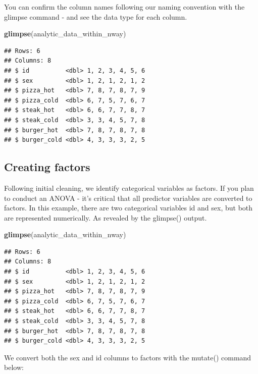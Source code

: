 \documentclass[
]{krantz}
\makeatletter
\newenvironment{Shaded}{\begin{snugshade}}{\end{snugshade}}
\newcommand{\KeywordTok}[1]{\textcolor[rgb]{0.27,0.27,0.27}{\textbf{#1}}}
\newcommand{\NormalTok}[1]{#1}
\newenvironment{kframe}{%
\medskip{}
\setlength{\fboxsep}{.8em}
 \def\at@end@of@kframe{}%
 \ifinner\ifhmode%
  \def\at@end@of@kframe{\end{minipage}}%
  \begin{minipage}{\columnwidth}%
 \fi\fi%
 \def\FrameCommand##1{\hskip\@totalleftmargin \hskip-\fboxsep
 \colorbox{shadecolor}{##1}\hskip-\fboxsep
     \hskip-\linewidth \hskip-\@totalleftmargin \hskip\columnwidth}%
 \MakeFramed {\advance\hsize-\width
   \@totalleftmargin\z@ \linewidth\hsize
   \@setminipage}}%
 {\par\unskip\endMakeFramed%
 \at@end@of@kframe}
\renewenvironment{Shaded}{\begin{kframe}}{\end{kframe}}
\makeatother
\begin{document}
You can confirm the column names following our naming convention with the glimpse command - and see the data type for each column.

\begin{Shaded}
\begin{Highlighting}[]
\KeywordTok{glimpse}\NormalTok{(analytic_data_within_nway)}
\end{Highlighting}
\end{Shaded}

\begin{verbatim}
## Rows: 6
## Columns: 8
## $ id          <dbl> 1, 2, 3, 4, 5, 6
## $ sex         <dbl> 1, 2, 1, 2, 1, 2
## $ pizza_hot   <dbl> 7, 8, 7, 8, 7, 9
## $ pizza_cold  <dbl> 6, 7, 5, 7, 6, 7
## $ steak_hot   <dbl> 6, 6, 7, 7, 8, 7
## $ steak_cold  <dbl> 3, 3, 4, 5, 7, 8
## $ burger_hot  <dbl> 7, 8, 7, 8, 7, 8
## $ burger_cold <dbl> 4, 3, 3, 3, 2, 5
\end{verbatim}

\hypertarget{creating-factors-2}{%
\subsection{Creating factors}\label{creating-factors-2}}

Following initial cleaning, we identify categorical variables as factors. If you plan to conduct an ANOVA - it's critical that all predictor variables are converted to factors. In this example, there are two categorical variables id and sex, but both are represented numerically. As revealed by the glimpse() output.

\begin{Shaded}
\begin{Highlighting}[]
\KeywordTok{glimpse}\NormalTok{(analytic_data_within_nway)}
\end{Highlighting}
\end{Shaded}

\begin{verbatim}
## Rows: 6
## Columns: 8
## $ id          <dbl> 1, 2, 3, 4, 5, 6
## $ sex         <dbl> 1, 2, 1, 2, 1, 2
## $ pizza_hot   <dbl> 7, 8, 7, 8, 7, 9
## $ pizza_cold  <dbl> 6, 7, 5, 7, 6, 7
## $ steak_hot   <dbl> 6, 6, 7, 7, 8, 7
## $ steak_cold  <dbl> 3, 3, 4, 5, 7, 8
## $ burger_hot  <dbl> 7, 8, 7, 8, 7, 8
## $ burger_cold <dbl> 4, 3, 3, 3, 2, 5
\end{verbatim}

We convert both the sex and id columns to factors with the mutate() command below:
\end{document}
